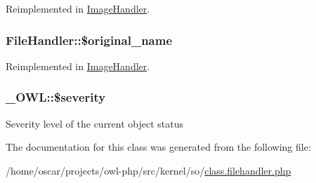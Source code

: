Reimplemented in \hyperlink{classImageHandler_a6a87b3626bd0a457c6937b3e9b1cc69b}{ImageHandler}.

\subsubsection[{\$original\_\-name}]{\setlength{\rightskip}{0pt plus 5cm}FileHandler::\$original\_\-name}\label{classFileHandler_a477708585850c3c8725ccf56bfe0b4a8}


Reimplemented in \hyperlink{classImageHandler_a1712c9444d65879aab111260767afaab}{ImageHandler}.

\subsubsection[{\$severity}]{\setlength{\rightskip}{0pt plus 5cm}\_\-OWL::\$severity}\label{class__OWL_ad26b40a9dbbacb33e299b17826f8327c}
Severity level of the current object status 

The documentation for this class was generated from the following file:\begin{DoxyCompactItemize}
\item 
/home/oscar/projects/owl-\/php/src/kernel/so/\hyperlink{class_8filehandler_8php}{class.filehandler.php}\end{DoxyCompactItemize}
